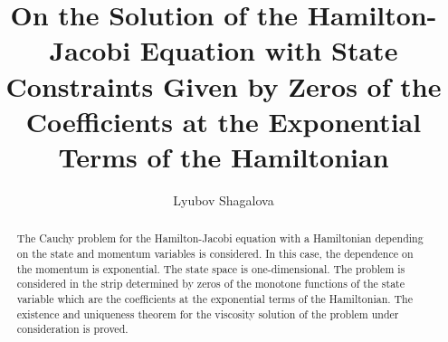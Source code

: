 \begin{englishtitle} %
\title{On the Solution of the Hamilton-Jacobi Equation with State Constraints Given by Zeros of the Coefficients at the Exponential Terms of the Hamiltonian}
\author{Lyubov Shagalova}
  
\maketitle

\begin{abstract}
The Cauchy problem for the Hamilton-Jacobi equation with a Hamiltonian depending on the state and momentum variables is considered. In this case, the dependence on the momentum  is exponential. The state space is one-dimensional. The problem is considered in the strip determined by zeros of the monotone functions of the state variable which are the coefficients at the exponential terms of the Hamiltonian. The existence and uniqueness theorem for the viscosity solution of the problem under consideration is proved. 

\end{abstract}
\end{englishtitle}


\iffalse
%
%

